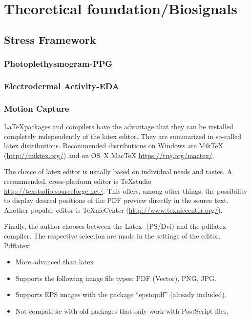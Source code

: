\chapter{Theoretical foundation/Biosignals}

\section{Stress Framework}
\subsection{Photoplethysmogram-PPG}
\subsection{Electrodermal Activity-EDA}
\subsection{Motion Capture}

\LaTeX packages and compilers have the advantage that they can be installed completely independently of the latex editor.
They are summarized in so-called latex distributions.
Recommended distributions on Windows are MikTeX (\href{http://miktex.org/}{http://miktex.org/}) and on OS~X MacTeX \href{https://tug.org/mactex/}{https://tug.org/mactex/}.

The choice of latex editor is usually based on individual needs and tastes.
A recommended, cross-platform editor is TeXstudio \href{http://texstudio.sourceforge.net/}{http://texstudio.sourceforge.net/}.
This offers, among other things, the possibility to display desired positions of the PDF preview directly in the source text.
Another popular editor is TeXnicCenter (\href{http://www.texniccenter.org/}{http://www.texniccenter.org/}).

Finally, the author chooses between the Latex- (PS/Dvi) and the pdflatex compiler.
The respective selection are made in the settings of the editor. \\

Pdflatex:
\begin{itemize}
	\item More advanced than latex
	\item Supports the following image file types: PDF (Vector), PNG, JPG.
	\item Supports EPS images with the package "`epstopdf"' (already included).
	\item Not compatible with old packages that only work with PostScript files.
\end{itemize}

